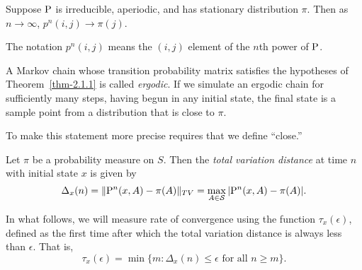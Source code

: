 \begin{theorem}
\label{thm-2.1.1}
Suppose $\P$ is irreducible, aperiodic, and has stationary distribution
$\pi$. Then as $n\rightarrow \infty$, $p^n(i,j) \rightarrow \pi(j)$.
\end{theorem}

The notation $p^n(i,j)$ means the $(i,j)$ element of the $n$th power of $\P$.

A Markov chain whose transition probability matrix satisfies the hypotheses of
Theorem~\ref{thm-2.1.1} is called \emph{ergodic}. If we simulate an ergodic chain for
sufficiently many steps, having 
%
%
%
%
%
%
begun in any initial state, the final state is a sample point from a
distribution that is close to $\pi$. 

To make this statement more precise requires that we define ``close.''
\begin{definition}
Let $\pi$ be a probability measure on $S$. Then the \emph{total variation distance} at time
$n$ with initial state $x$ is given by 
\[
\Delta_x(n) = \|\P^n(x, A) - \pi(A)\|_{TV} = \max_{A\in \S} | \P^n(x,A)-\pi(A)|.
\]
\end{definition}
In what follows, we will measure rate of convergence using the function
$\tau_x(\epsilon)$, defined as the first time after which the total variation
distance is always less than $\epsilon$. That is, 
\[
\tau_x(\epsilon) = \min\{m : \Delta_x(n) \leq \epsilon \text{ for all } n\geq
m\}.
\]


